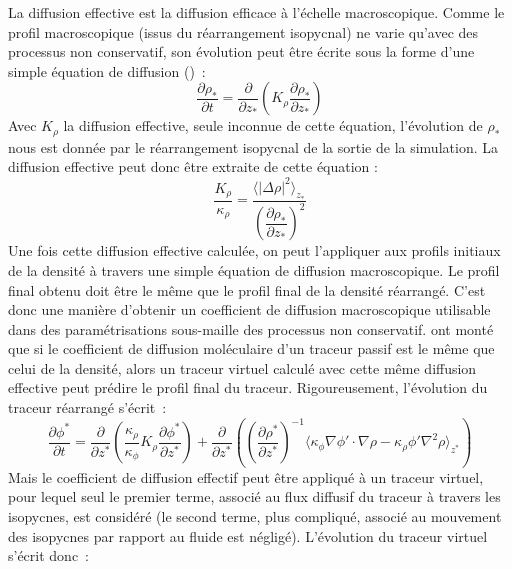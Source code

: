 \documentclass[a4paper,12pt]{article}
\begin{document}
        La diffusion effective est la diffusion efficace à l'échelle macroscopique. Comme le profil macroscopique (issus du réarrangement isopycnal) ne varie qu'avec des processus non conservatif, son évolution peut être écrite sous la forme d'une simple équation de diffusion (\citep{penney_diapycnal_2020-1}) : 
        \begin{equation}
            \label{rho*}
            \frac{\partial\rho_*}{\partial t}=\frac{\partial}{\partial z_*}(K_{\rho}\frac{\partial\rho_*}{\partial z_*})
        \end{equation}
        Avec $K_{\rho}$ la diffusion effective, seule inconnue de cette équation, l'évolution de $\rho_*$ nous est donnée par le réarrangement isopycnal de la sortie de la simulation. La diffusion effective peut donc être extraite de cette équation :
        \begin{equation}
            \label{Keff}
            \frac{K_{\rho}}{\kappa_{\rho}}=\frac{\langle\vert\Delta\rho\vert^2\rangle_{z_*}}{(\dfrac{\partial\rho_*}{\partial z_*})^2}
        \end{equation}
        Une fois cette diffusion effective calculée, on peut l'appliquer aux profils initiaux de la densité à travers une simple équation de diffusion macroscopique. Le profil final obtenu doit être le même que le profil final de la densité réarrangé. C'est donc une manière d'obtenir un coefficient de diffusion macroscopique utilisable dans des paramétrisations sous-maille des processus non conservatif. \cite{penney_diapycnal_2020} ont monté que si le coefficient de diffusion moléculaire d'un traceur passif est le même que celui de la densité, alors un traceur virtuel calculé avec cette même diffusion effective peut prédire le profil final du traceur. Rigoureusement, l'évolution du traceur réarrangé s'écrit : 
        \begin{equation}
           \frac{\partial\phi^*}{\partial t} = \frac{\partial}{\partial z^*} (\frac{\kappa_{\rho}}{\kappa_{\phi}}K_{\rho}\frac{\partial\phi^*}{\partial z^*}) + \frac{\partial}{\partial z^*} ((\frac{\partial\rho^*}{\partial z^*})^{-1} \langle\kappa_{\phi}\nabla\phi'\cdot \nabla\rho - \kappa_{\rho}\phi'\nabla^2\rho\rangle_{z^*})
        \end{equation}
        Mais le coefficient de diffusion effectif peut être appliqué à un traceur virtuel, pour lequel seul le premier terme, associé au flux diffusif du traceur à travers les isopycnes, est considéré (le second terme, plus compliqué, associé au mouvement des isopycnes par rapport au fluide est négligé). L'évolution du traceur virtuel s'écrit donc :
\end{document}
